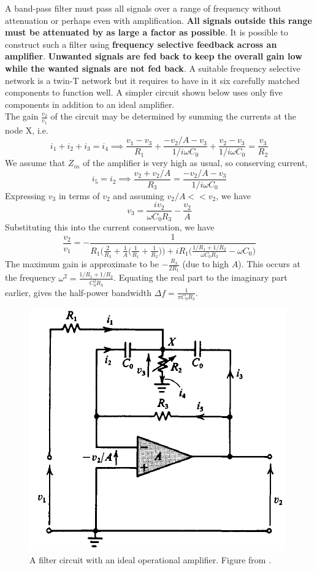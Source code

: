 \documentclass[a4paper]{article}
\begin{document}
\begin{eg}[Filter]
A band-pass filter must pass all signals over a range of frequency without attenuation or perhaps even with amplification. \textbf{All signals outside this range must be attenuated by as large a factor as possible}. It is possible to construct such a filter using \textbf{frequency selective feedback across an amplifier}. \textbf{Unwanted signals are fed back to keep the overall gain low while the wanted signals are not fed back}. A suitable frequency selective network is a twin-T network but it requires to have in it six carefully matched components to function well. A simpler circuit shown below uses only five components in addition to an ideal amplifier.\\[5pt]
The gain $\frac{v_2}{v_1}$ of the circuit may be determined by summing the currents at the node X, i.e. $$i_1+i_2+i_3=i_4\implies\frac{v_1-v_3}{R_1}+\frac{-v_2/A-v_3}{1/i\omega C_0}+\frac{v_2-v_3}{1/i\omega C_0}=\frac{v_3}{R_2}$$
We assume that $Z_{in}$ of the amplifier is very high as usual, so conserving current, $$i_5=i_2\implies\frac{v_2+v_2/A}{R_3}=\frac{-v_2/A-v_3}{1/i\omega C_0}$$ Expressing $v_3$ in terms of $v_2$ and assuming $v_2/A<<v_2$, we have $$v_3=\frac{iv_2}{\omega C_0R_3}-\frac{v_2}{A}$$
Substituting this into the current conservation, we have
$$\frac{v_2}{v_1}=-\frac{1}{R_1\bigg(\frac{2}{R_3}+\frac{1}{A}\bigg(\frac{1}{R_1}+\frac{1}{R_2}\bigg)\bigg)+iR_1\bigg(\frac{1/R_1+1/R_2}{\omega C_0R_3}-\omega C_0\bigg)}$$
The maximum gain is approximate to be $-\frac{R_3}{2R_1}$ (due to high $A$). This occurs at the frequency $\omega^2=\frac{1/R_1+1/R_2}{C_0^2R_3}$. Equating the real part to the imaginary part earlier, gives the half-power bandwidth $\Delta f=\frac{1}{\pi C_0R_3}$. 
\end{eg}

\begin{figure}[H]
    \centering
    \includegraphics{filter.PNG}
    \caption{A filter circuit with an ideal operational amplifier. Figure from \cite{ahmed_spreadbury_1984}.}
    \label{filter}
\end{figure}
\newpage
\end{document}
